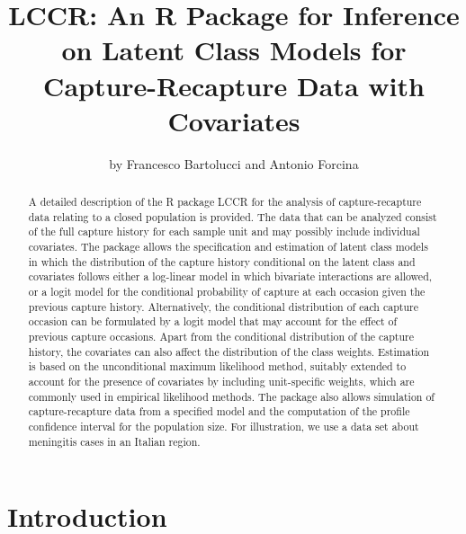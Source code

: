 \title{LCCR: An R Package for Inference on Latent Class Models for Capture-Recapture Data with Covariates}
\author{by Francesco Bartolucci and Antonio Forcina}

\maketitle

\begin{abstract}
A detailed description of the R package LCCR for the analysis of capture-recapture data relating to a closed population is provided.
The data that can be analyzed consist of the full capture history for each sample unit and may possibly include individual covariates.
The package allows the specification and estimation of latent class models in which the distribution of the capture history conditional on the latent class and covariates follows either a log-linear model in which bivariate interactions are allowed, or a logit model for the conditional probability of capture at each occasion given the previous capture history.
Alternatively, the conditional distribution of each capture occasion can be formulated by a logit model that may account for the effect of previous capture occasions.
Apart from the conditional distribution of the capture history, the covariates can also affect the distribution of the class weights.
Estimation is based on the unconditional maximum likelihood method, suitably extended to account for the presence of covariates by including unit-specific weights, which are commonly used in empirical likelihood methods.
The package also allows simulation of capture-recapture data from a specified model and the computation of the profile confidence interval for the population size.
For illustration, we use a data set about meningitis cases in an Italian region.
\end{abstract}

\section{Introduction}

